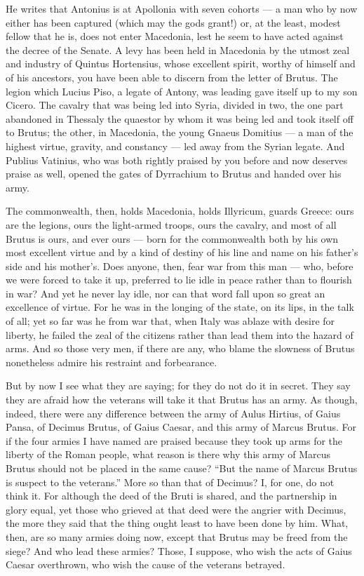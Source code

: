  He writes that Antonius is at Apollonia with seven cohorts --- a man who by now either has been captured (which may the gods grant!) or, at the least, modest fellow that he is, does not enter Macedonia, lest he seem to have acted against the decree of the Senate. A levy has been held in Macedonia by the utmost zeal and industry of Quintus Hortensius, whose excellent spirit, worthy of himself and of his ancestors, you have been able to discern from the letter of Brutus. The legion which Lucius Piso, a legate of Antony, was leading gave itself up to my son Cicero. The cavalry that was being led into Syria, divided in two, the one part abandoned in Thessaly the quaestor by whom it was being led and took itself off to Brutus; the other, in Macedonia, the young Gnaeus Domitius --- a man of the highest virtue, gravity, and constancy --- led away from the Syrian legate. And Publius Vatinius, who was both rightly praised by you before and now deserves praise as well, opened the gates of Dyrrachium to Brutus and handed over his army.

 The commonwealth, then, holds Macedonia, holds Illyricum, guards Greece: ours are the legions, ours the light-armed troops, ours the cavalry, and most of all Brutus is ours, and ever ours --- born for the commonwealth both by his own most excellent virtue and by a kind of destiny of his line and name on his father's side and his mother's. Does anyone, then, fear war from this man --- who, before we were forced to take it up, preferred to lie idle in peace rather than to flourish in war? And yet he never lay idle, nor can that word fall upon so great an excellence of virtue. For he was in the longing of the state, on its lips, in the talk of all; yet so far was he from war that, when Italy was ablaze with desire for liberty, he failed the zeal of the citizens rather than lead them into the hazard of arms. And so those very men, if there are any, who blame the slowness of Brutus nonetheless admire his restraint and forbearance.

 But by now I see what they are saying; for they do not do it in secret. They say they are afraid how the veterans will take it that Brutus has an army. As though, indeed, there were any difference between the army of Aulus Hirtius, of Gaius Pansa, of Decimus Brutus, of Gaius Caesar, and this army of Marcus Brutus. For if the four armies I have named are praised because they took up arms for the liberty of the Roman people, what reason is there why this army of Marcus Brutus should not be placed in the same cause? ``But the name of Marcus Brutus is suspect to the veterans.'' More so than that of Decimus? I, for one, do not think it. For although the deed of the Bruti is shared, and the partnership in glory equal, yet those who grieved at that deed were the angrier with Decimus, the more they said that the thing ought least to have been done by him. What, then, are so many armies doing now, except that Brutus may be freed from the siege? And who lead these armies? Those, I suppose, who wish the acts of Gaius Caesar overthrown, who wish the cause of the veterans betrayed.

